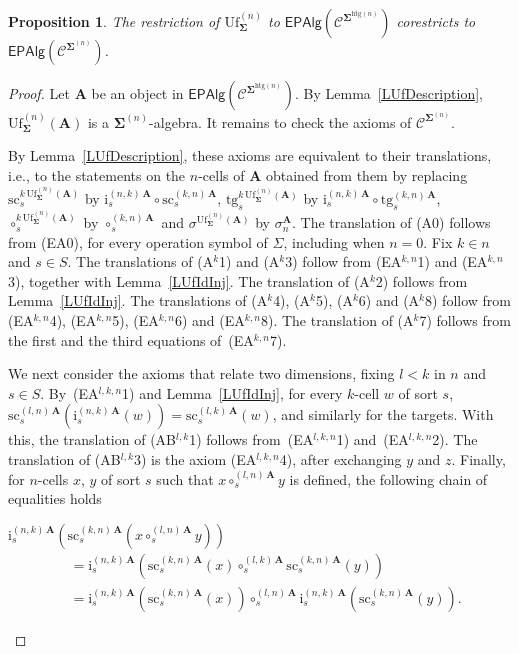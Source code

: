 \documentclass[a4paper, reqno]{amsbook}
\newcommand{\sig}[1]{\mathbf{#1}}             %
\newcommand{\spec}[1]{\boldsymbol{\mathcal{#1}}} %
\newcommand{\htg}{\mathrm{htg}}                %
\newcommand{\src}{\mathrm{sc}}
\newcommand{\tgt}{\mathrm{tg}}
\newcommand{\Uf}{\mathrm{Uf}}
\theoremstyle{plain}
\newtheorem{proposition}[theorem]{Proposition}
\theoremstyle{definition}
\begin{document}
\begin{proposition}\label{PUfEpVariety}
The restriction of $\Uf^{(n)}_{\sig{\Sigma}}$ to $\mathsf{EPAlg}(\spec{C}^{\sig{\Sigma}^{\htg(n)}})$ corestricts to $\mathsf{EPAlg}(\spec{C}^{\sig{\Sigma}^{(n)}})$.
\end{proposition}
\begin{proof}
Let $\mathbf{A}$ be an object in $\mathsf{EPAlg}(\spec{C}^{\sig{\Sigma}^{\htg(n)}})$.
By Lemma~\ref{LUfDescription}, $\Uf^{(n)}_{\sig{\Sigma}}(\mathbf{A})$ is a $\sig{\Sigma}^{(n)}$-algebra.
It remains to check the axioms of $\spec{C}^{\sig{\Sigma}^{(n)}}$.

By Lemma~\ref{LUfDescription}, these axioms are equivalent to their translations, i.e., to the statements on the $n$-cells of $\mathbf{A}$ obtained from them by replacing $\src^{k\,\Uf^{(n)}_{\sig{\Sigma}}(\mathbf{A})}_{s}$ by $\mathrm{i}^{(n,k)\,\mathbf{A}}_{s}\circ\src^{(k,n)\,\mathbf{A}}_{s}$, $\tgt^{k\,\Uf^{(n)}_{\sig{\Sigma}}(\mathbf{A})}_{s}$ by $\mathrm{i}^{(n,k)\,\mathbf{A}}_{s}\circ\tgt^{(k,n)\,\mathbf{A}}_{s}$, $\circ^{k\,\Uf^{(n)}_{\sig{\Sigma}}(\mathbf{A})}_{s}$ by $\circ^{(k,n)\,\mathbf{A}}_{s}$ and $\sigma^{\Uf^{(n)}_{\sig{\Sigma}}(\mathbf{A})}$ by $\sigma_{n}^{\mathbf{A}}$.
The translation of (A0) follows from (EA0), for every operation symbol of $\Sigma$, including when $n=0$.
Fix $k\in n$ and $s\in S$.
The translations of (A$^{k}$1) and (A$^{k}$3) follow from (EA$^{k,n}$1) and (EA$^{k,n}$3), together with Lemma~\ref{LUfIdInj}.
The translation of (A$^{k}$2) follows from Lemma~\ref{LUfIdInj}.
The translations of (A$^{k}$4), (A$^{k}$5), (A$^{k}$6) and (A$^{k}$8) follow from (EA$^{k,n}$4), (EA$^{k,n}$5), (EA$^{k,n}$6) and (EA$^{k,n}$8).
The translation of (A$^{k}$7) follows from the first and the third equations of~(EA$^{k,n}$7).

We next consider the axioms that relate two dimensions, fixing $l<k$ in $n$ and $s\in S$.
By~(EA$^{l,k,n}$1) and Lemma~\ref{LUfIdInj}, for every $k$-cell $w$ of sort $s$, $\src^{(l,n)\,\mathbf{A}}_{s}(\mathrm{i}^{(n,k)\,\mathbf{A}}_{s}(w))=\src^{(l,k)\,\mathbf{A}}_{s}(w)$, and similarly for the targets.
With this, the translation of (AB$^{l,k}$1) follows from~(EA$^{l,k,n}$1) and~(EA$^{l,k,n}$2).
The translation of (AB$^{l,k}$3) is the axiom (EA$^{l,k,n}$4), after exchanging $y$ and $z$.
Finally, for $n$-cells $x$, $y$ of sort $s$ such that $x\circ^{(l,n)\,\mathbf{A}}_{s}y$ is defined, the following chain of equalities holds
\begin{flushleft}
$
\mathrm{i}^{(n,k)\,\mathbf{A}}_{s}\left(\src^{(k,n)\,\mathbf{A}}_{s}\left(x\circ^{(l,n)\,\mathbf{A}}_{s}y\right)\right)
$
\begin{align*}
&=
\mathrm{i}^{(n,k)\,\mathbf{A}}_{s}\left(\src^{(k,n)\,\mathbf{A}}_{s}(x)\circ^{(l,k)\,\mathbf{A}}_{s}\src^{(k,n)\,\mathbf{A}}_{s}(y)\right)
\tag{1}
\\&=
\mathrm{i}^{(n,k)\,\mathbf{A}}_{s}\left(\src^{(k,n)\,\mathbf{A}}_{s}(x)\right)\circ^{(l,n)\,\mathbf{A}}_{s}\mathrm{i}^{(n,k)\,\mathbf{A}}_{s}\left(\src^{(k,n)\,\mathbf{A}}_{s}(y)\right).
\tag{2}
\end{align*}
\end{flushleft}


\end{proof}
\end{document}
